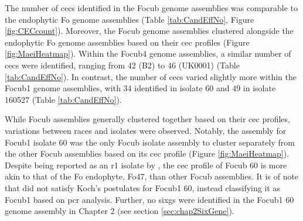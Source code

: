 The number of \acp{cec} identified in the \ac{Focub} genome assemblies was comparable to the endophytic \ac{Fo} genome assemblies (Table \ref{tab:CandEffNo}, Figure \ref{fig:CECcount}). Moreover, the \ac{Focub} genome assemblies clustered alongside the endophytic \ac{Fo} genome assemblies based on their \ac{cec} profiles (Figure \ref{fig:MaeiHeatmap}). Within the \ac{Focub4} genome assemblies, a similar number of \acp{cec} were identified, ranging from 42 (B2) to 46 (UK0001) (Table \ref{tab:CandEffNo}). In contrast, the number of \acp{cec} varied slightly more within the \ac{Focub1} genome assemblies, with 34 identified in isolate 60 and 49 in isolate 160527 (Table \ref{tab:CandEffNo}).

While \ac{Focub} assemblies generally clustered together based on their \ac{cec} profiles, variations between races and isolates were observed. Notably, the assembly for \ac{Focub1} isolate 60 was the only \ac{Focub} isolate assembly to cluster separately from the other \ac{Focub} assemblies based on its \ac{cec} profile (Figure \ref{fig:MaeiHeatmap}). Despite being reported as an \ac{r1} isolate by \textcite{Yun2019}, the \ac{cec} profile of \ac{Focub} 60 is more akin to that of the \ac{Fo} endophyte, Fo47, than other \ac{Focub} assemblies. It is of note that \textcite{Yun2019} did not satisfy Koch's postulates for \ac{Focub1} 60, instead classifying it as \ac{Focub1} based on \ac{pcr} analysis. Further, no \acp{sixg} were identified in the \ac{Focub1} 60 genome assembly in Chapter 2 (see section \ref{sec:chap2SixGene}). 

